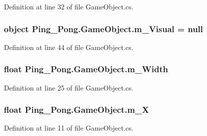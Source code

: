 Definition at line 32 of file Game\-Object.\-cs.

\hypertarget{class_ping___pong_1_1_game_object_a5009be35d8fba10d72173a954caef57c}{
\subsubsection[{m\-\_\-\-Visual}]{\setlength{\rightskip}{0pt plus 5cm}object Ping\-\_\-\-Pong.\-Game\-Object.\-m\-\_\-\-Visual = null\hspace{0.3cm}{\ttfamily [protected]}}}\label{class_ping___pong_1_1_game_object_a5009be35d8fba10d72173a954caef57c}


Definition at line 44 of file Game\-Object.\-cs.

\hypertarget{class_ping___pong_1_1_game_object_ac75ebfdec034a75ed71dbf91eface23f}{
\subsubsection[{m\-\_\-\-Width}]{\setlength{\rightskip}{0pt plus 5cm}float Ping\-\_\-\-Pong.\-Game\-Object.\-m\-\_\-\-Width\hspace{0.3cm}{\ttfamily [protected]}}}\label{class_ping___pong_1_1_game_object_ac75ebfdec034a75ed71dbf91eface23f}


Definition at line 25 of file Game\-Object.\-cs.

\hypertarget{class_ping___pong_1_1_game_object_a292627bfcfe03c2f5a1dc403faa37690}{
\subsubsection[{m\-\_\-\-X}]{\setlength{\rightskip}{0pt plus 5cm}float Ping\-\_\-\-Pong.\-Game\-Object.\-m\-\_\-\-X\hspace{0.3cm}{\ttfamily [protected]}}}\label{class_ping___pong_1_1_game_object_a292627bfcfe03c2f5a1dc403faa37690}


Definition at line 11 of file Game\-Object.\-cs.


